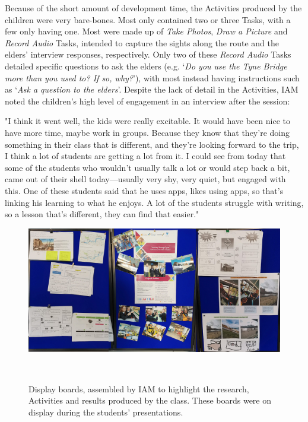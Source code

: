 Because of the short amount of development time, the Activities produced by the children were very bare-bones. Most only contained two or three Tasks, with a few only having one. Most were made up of \textit{Take Photos}, \textit{Draw a Picture} and \textit{Record Audio} Tasks, intended to capture the sights along the route and the elders' interview responses, respectively. Only two of these \textit{Record Audio} Tasks detailed specific questions to ask the elders (e.g. `\textit{Do you use the Tyne Bridge more than you used to? If so, why?}'), with most instead having instructions such as `\textit{Ask a question to the elders}'. Despite the lack of detail in the Activities, IAM noted the children's high level of engagement in an interview after the session:

\begin{displayquote}
"I think it went well, the kids were really excitable. It would have been nice to have more time, maybe work in groups. Because they know that they're doing something in their class that is different, and they're looking forward to the trip, I think a lot of students are getting a lot from it. I could see from today that some of the students who wouldn't usually talk a lot or would step back a bit, came out of their shell today---usually very shy, very quiet, but engaged with this. One of these students said that he uses apps, likes using apps, so that's linking his learning to what he enjoys. A lot of the students struggle with writing, so a lesson that's different, they can find that easier."
\end{displayquote}

\begin{figure}
\centering
  \includegraphics[width=1\columnwidth]{images/chapter08/displayBoards.jpg}
  \caption[Display boards showing students' work]{Display boards, assembled by IAM to highlight the research, Activities and results produced by the class. These boards were on display during the students' presentations.}~\label{fig:DisplayBoards}
\end{figure}

